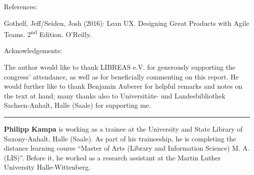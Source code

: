 \documentclass[a4paper,
fontsize=11pt,
oneside,
numbers=noperiodatend,
parskip=half-,
bibliography=totoc,
final
]{scrartcl}
\begin{document}
References:

Gothelf, Jeff/Seiden, Josh (2016): Lean UX. Designing Great Products
with Agile Teams. 2\textsuperscript{nd} Edition. O'Reilly.

Acknowledgements:

The author would like to thank LIBREAS e.V. for generously supporting
the congress' attendance, as well as for beneficially commenting on this
report. He would further like to thank Benjamin Auberer for helpful
remarks and notes on the text at hand; many thanks also to Universitäts-
und Landesbibliothek Sachsen-Anhalt, Halle (Saale) for supporting me.

\begin{center}\rule{0.5\linewidth}{\linethickness}\end{center}

\textbf{Philipp Kampa} is working as a trainee at the University and
State Library of Saxony-Anhalt, Halle (Saale). As part of his
traineeship, he is completing the distance learning course ``Master of
Arts (Library and Information Science) M. A. (LIS)''. Before it, he
worked as a research assistant at the Martin Luther University
Halle-Wittenberg.
\end{document}
